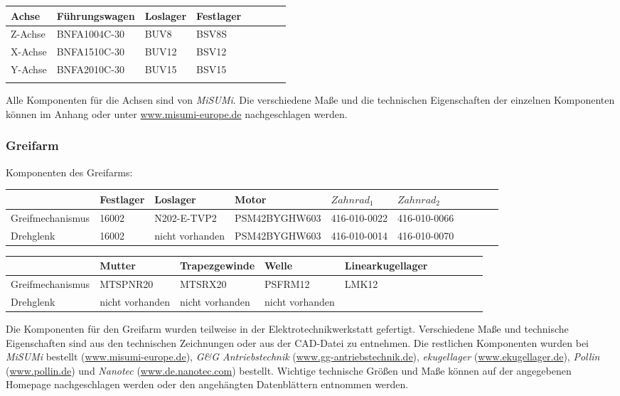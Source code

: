 \documentclass{scrartcl}
\begin{document}
\begin{tabular}{l l l l l l l l}
\rowcolor{hellgruen}
Achse&Führungswagen&Loslager&Festlager\\
\hline
Z-Achse&BNFA1004C-30&BUV8&BSV8S\\
\hline
X-Achse&BNFA1510C-30&BUV12&BSV12\\
\hline
Y-Achse&BNFA2010C-30&BUV15&BSV15\\
\newline
\newline
\end{tabular}

Alle Komponenten für die Achsen sind von \textsl{MiSUMi}. Die verschiedene Maße und die technischen Eigenschaften der einzelnen Komponenten  können im Anhang oder unter \url{www.misumi-europe.de} nachgeschlagen werden.
 


\subsubsection{Greifarm}




Komponenten des Greifarms:\\
\newline
\begin{tabular}{l| l l l l l l l l l}
\rowcolor{hellgruen}
 &Festlager&Loslager&Motor&$Zahnrad_1$&$Zahnrad_2$\\	%
\hline
Greifmechanismus&16002&N202-E-TVP2&PSM42BYGHW603&416-010-0022&416-010-0066\\
\hline
Drehglenk&16002&nicht vorhanden&PSM42BYGHW603&416-010-0014&416-010-0070\\
\end{tabular}
\newline
\newline

\begin{tabular}{l| l l l l l l l l l}
\rowcolor{hellgruen}
 &Mutter&Trapezgewinde&Welle&Linearkugellager\\	%
\hline
Greifmechanismus&MTSPNR20&MTSRX20&PSFRM12&LMK12\\
\hline
Drehglenk&nicht vorhanden&nicht vorhanden&nicht vorhanden&\\
\end{tabular}
\newline
\newline
Die Komponenten für den Greifarm wurden teilweise in der Elektrotechnikwerkstatt gefertigt. Verschiedene Maße und
technische Eigenschaften sind aus den technischen Zeichnungen oder aus der CAD-Datei zu entnehmen. Die restlichen Komponenten wurden bei \textsl{MiSUMi} bestellt (\url{www.misumi-europe.de}), \textsl{G\&G Antriebstechnik} (\url{www.gg-antriebstechnik.de}), \textsl{ekugellager} (\url{www.ekugellager.de}), \textsl{Pollin} (\url{www.pollin.de}) und \textsl{Nanotec} (\url{www.de.nanotec.com}) bestellt. Wichtige technische Größen und Maße können auf der angegebenen Homepage nachgeschlagen werden oder den angehängten Datenblättern entnommen werden.
 
\end{document}
